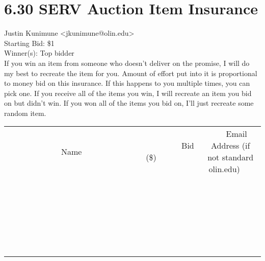 \documentclass[11pt]{article}
\begin{document}
					\section*{6.30 SERV Auction Item Insurance}
					Justin Kunimune <jkunimune@olin.edu> \\
					Starting Bid: \$1 \\
					Winner(s): Top bidder \\
					If you win an item from someone who doesn't deliver on the promise, I will do my best to recreate the item for you. Amount of effort put into it is proportional to money bid on this insurance. If this happens to you multiple times, you can pick one. If you receive all of the items you win, I will recreate an item you bid on but didn't win. If you won all of the items you bid on, I'll just recreate some random item. \\
					[6ex]
					\begin{tabular}{c c c}
						~~~~~~~~~~~~~Name~~~~~~~~~~~~~ & ~~~~~~~~~Bid (\$)~~~~~~~~~ & ~~~Email Address (if not standard olin.edu)~~~ \\
				
 & & \\
\hline
 & & \\
\hline
 & & \\
\hline
 & & \\
\hline
 & & \\
\hline
 & & \\
\hline
 & & \\
\hline
 & & \\
\hline
 & & \\
\hline
 & & \\
\hline
 & & \\
\hline
 & & \\
\hline
 & & \\
\hline
 & & \\
\hline
 & & \\
\hline
 & & \\
\hline
 & & \\
\hline
 & & \\
\hline
 & & \\
\hline
 & & \\
\hline
 & & \\
\hline
 & & \\
\hline
 & & \\
\hline
 & & \\
\hline
 & & \\
\hline
 & & \\
\hline
					\end{tabular}
					\clearpage
				
\end{document}
